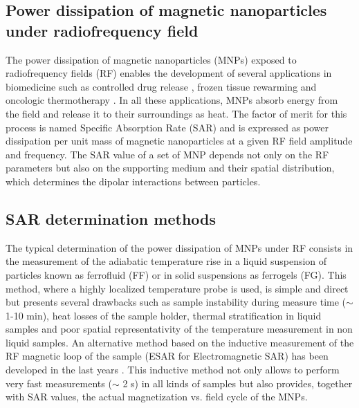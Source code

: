 \documentclass[preprint,12pt]{elsarticle}
\begin{document}
\subsection{Power dissipation of magnetic nanoparticles under radiofrequency field}
The power dissipation of magnetic nanoparticles (MNPs) exposed to radiofrequency fields (RF) enables the development of several applications in biomedicine such as controlled drug release \cite{bruvera2015integrated}, frozen tissue rewarming \cite{manuchehrabadi2017improved} and oncologic thermotherapy    \cite{stephen2021recent}. In all these applications, MNPs absorb energy from the field and release it to their surroundings as heat. The factor of merit for this process is named Specific Absorption Rate (SAR) and is expressed as power dissipation per unit mass of magnetic nanoparticles at a given RF field amplitude and frequency. The SAR value of a set of MNP depends not only on the RF parameters but also on the supporting medium and their spatial distribution, which determines the dipolar interactions between particles.

\subsection{SAR determination methods}
The typical determination of the power dissipation of MNPs under RF consists in the measurement of the adiabatic temperature rise in a liquid suspension of particles known as ferrofluid (FF) or in solid suspensions as ferrogels (FG). This method, where a highly localized temperature probe is used, is simple and direct but presents several drawbacks such as sample instability during measure time ($\sim$ 1-10 min), heat losses of the sample holder, thermal stratification in liquid samples and poor spatial representativity of the temperature measurement in non liquid samples\cite{wang2012potential}. An alternative method based on the inductive measurement of the RF magnetic loop of the sample (ESAR for Electromagnetic SAR) has been developed in the last years \cite{gudoshnikov2013ac,garaio2014}. This inductive method not only allows to perform very fast measurements ($\sim$ 2 s) in all kinds of samples but also provides, together with SAR values, the actual magnetization vs. field cycle of the MNPs.
\end{document}

